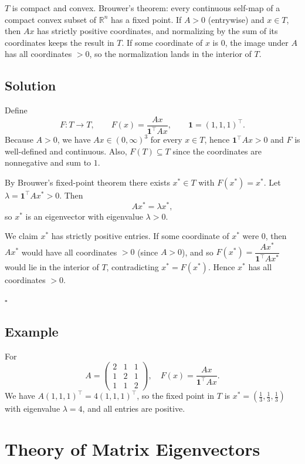 \documentclass[12pt,a4paper]{article}
\newcommand{\qed}{\hfill$\square$}
\theoremstyle{plain}
\theoremstyle{definition}
\theoremstyle{remark}
\theoremstyle{remark}
\begin{document}
$T$ is compact and convex. Brouwer's theorem: every continuous self-map of a compact convex
subset of $\mathbb{R}^n$ has a fixed point. If $A>0$ (entrywise) and $x\in T$, then $Ax$ has
strictly positive coordinates, and normalizing by the sum of its coordinates keeps the result in $T$.
If some coordinate of $x$ is $0$, the image under $A$ has all coordinates $>0$, so the normalization
lands in the interior of $T$.

\bigskip

\subsection*{Solution}

Define
\[
F:T\to T,\qquad F(x)=\frac{Ax}{\mathbf{1}^\top Ax},\qquad \mathbf{1}=(1,1,1)^\top .
\]
Because $A>0$, we have $Ax\in(0,\infty)^3$ for every $x\in T$, hence $\mathbf{1}^\top Ax>0$
and $F$ is well-defined and continuous. Also, $F(T)\subseteq T$ since the coordinates are
nonnegative and sum to $1$.

By Brouwer's fixed-point theorem there exists $x^\ast\in T$ with $F(x^\ast)=x^\ast$.
Let $\lambda=\mathbf{1}^\top Ax^\ast>0$. Then
\[
Ax^\ast=\lambda x^\ast ,
\]
so $x^\ast$ is an eigenvector with eigenvalue $\lambda>0$.

We claim $x^\ast$ has strictly positive entries. If some coordinate of $x^\ast$ were $0$,
then $Ax^\ast$ would have all coordinates $>0$ (since $A>0$), and so
$F(x^\ast)=\dfrac{Ax^\ast}{\mathbf{1}^\top Ax^\ast}$ would lie in the interior of $T$,
contradicting $x^\ast=F(x^\ast)$. Hence $x^\ast$ has all coordinates $>0$.

\qed

\bigskip

\subsection*{Example}

For
\[
A=
\begin{pmatrix}
	2&1&1\\
	1&2&1\\
	1&1&2
\end{pmatrix},
\quad
F(x)=\frac{Ax}{\mathbf{1}^\top Ax}.
\]
We have $A(1,1,1)^\top=4(1,1,1)^\top$, so the fixed point in $T$ is
$x^\ast=(\tfrac13,\tfrac13,\tfrac13)$ with eigenvalue $\lambda=4$, and all entries are positive.

	\section*{Theory of Matrix Eigenvectors}
	
\end{document}
